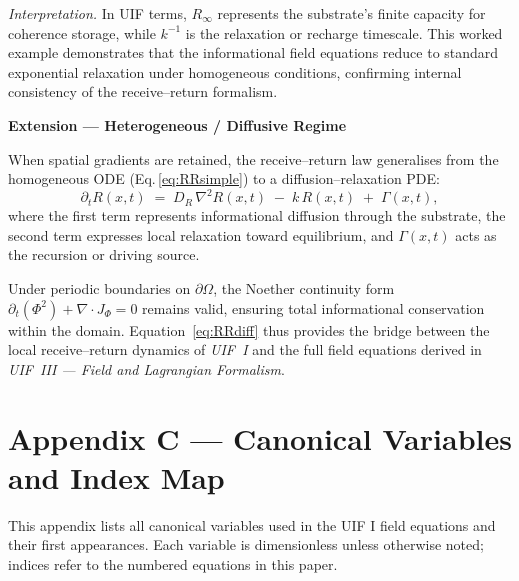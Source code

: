 \noindent\textit{Interpretation.}  
In UIF terms, $R_{\infty}$ represents the substrate’s finite capacity for
coherence storage, while $k^{-1}$ is the relaxation or recharge timescale.
This worked example demonstrates that the informational field equations reduce
to standard exponential relaxation under homogeneous conditions,
confirming internal consistency of the receive–return formalism.

\clearpage
\noindent\textbf{Extension — Heterogeneous / Diffusive Regime}

\noindent
When spatial gradients are retained, the receive–return law generalises from the
homogeneous ODE (Eq.\,\ref{eq:RRsimple}) to a diffusion–relaxation PDE:
\begin{equation}
\label{eq:RRdiff}
\partial_t R(x,t) \;=\; D_R\,\nabla^2 R(x,t) \;-\; k\,R(x,t) \;+\; \Gamma(x,t),
\end{equation}
where the first term represents informational diffusion through the substrate,
the second term expresses local relaxation toward equilibrium, and
$\Gamma(x,t)$ acts as the recursion or driving source.

\noindent
Under periodic boundaries on $\partial\Omega$, the Noether continuity form
$\partial_t(\Phi^2)+\nabla\!\cdot J_\Phi=0$ remains valid,
ensuring total informational conservation within the domain.
Equation~\eqref{eq:RRdiff} thus provides the bridge between the local
receive–return dynamics of \textit{UIF~I} and the full field equations derived in
\textit{UIF~III — Field and Lagrangian Formalism}.



\clearpage
\section*{Appendix C — Canonical Variables and Index Map}

\noindent
This appendix lists all canonical variables used in the UIF I field equations and
their first appearances.  Each variable is dimensionless unless otherwise noted;
indices refer to the numbered equations in this paper.

